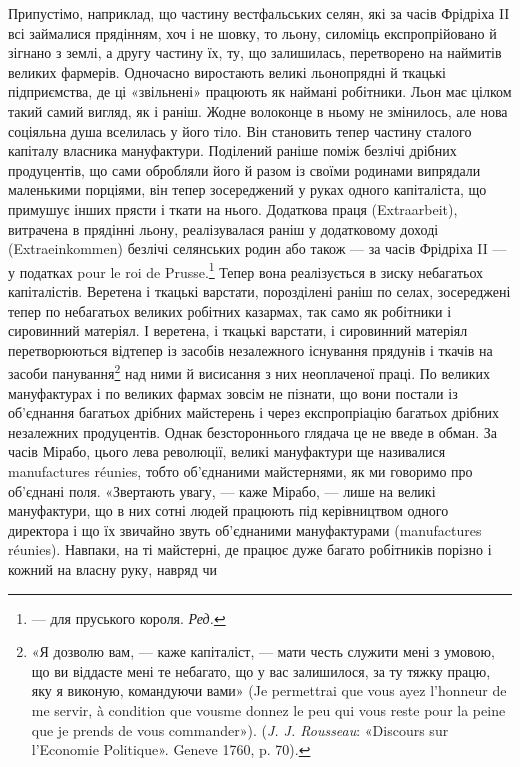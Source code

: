 Припустімо, наприклад, що частину вестфальських селян,
які за часів Фрідріха II всі займалися прядінням, хоч і не шовку,
то льону, силоміць експропрійовано й зігнано з землі, а другу
частину їх, ту, що залишилась, перетворено на наймитів великих
фармерів. Одночасно виростають великі льонопрядні й ткацькі
підприємства, де ці «звільнені» працюють як наймані робітники.
Льон має цілком такий самий вигляд, як і раніш. Жодне волоконце
в ньому не змінилось, але нова соціяльна душа вселилась
у його тіло. Він становить тепер частину сталого капіталу власника
мануфактури. Поділений раніше поміж безлічі дрібних
продуцентів, що сами обробляли його й разом із своїми родинами
випрядали маленькими порціями, він тепер зосереджений у руках
одного капіталіста, що примушує інших прясти і ткати на
нього. Додаткова праця (Extraarbeit), витрачена в прядінні
льону, реалізувалася раніш у додатковому доході (Extraeinkommen)
безлічі селянських родин або також — за часів Фрідріха
II — у податках pour le roi de Prusse.\footnote*{
— для пруського короля. \emph{Ред.}
} Тепер вона реалізується
в зиску небагатьох капіталістів. Веретена і ткацькі варстати,
порозділені раніш по селах, зосереджені тепер по небагатьох
великих робітних казармах, так само як робітники і сировинний
матеріял. І веретена, і ткацькі варстати, і сировинний
матеріял перетворюються відтепер із засобів незалежного існування
прядунів і ткачів на засоби панування\footnote{
«Я дозволю вам, — каже капіталіст, — мати честь служити мені
з умовою, що ви віддасте мені те небагато, що у вас залишилося, за ту
тяжку працю, яку я виконую, командуючи вами» (Je permettrai que
vous ayez l’honneur de me servir, à condition que vousme donnez le peu
qui vous reste pour la peine que je prends de vous commander»). (\emph{J. J. Rousseau}:
«Discours sur l’Economie Politique». Geneve 1760, p. 70).
} над ними й висисання
з них неоплаченої праці. По великих мануфактурах і по
великих фармах зовсім не пізнати, що вони постали із об’єднання
багатьох дрібних майстерень і через експропріацію багатьох
дрібних незалежних продуцентів. Однак безстороннього глядача
це не введе в обман. За часів Мірабо, цього лева революції, великі
мануфактури ще називалися manufactures réunies, тобто об’єднаними
майстернями, як ми говоримо про об’єднані поля. «Звертають
увагу, — каже Мірабо, — лише на великі мануфактури,
що в них сотні людей працюють під керівництвом одного директора
і що їх звичайно звуть об’єднаними мануфактурами (manufactures
réunies). Навпаки, на ті майстерні, де працює дуже багато
робітників порізно і кожний на власну руку, навряд чи
